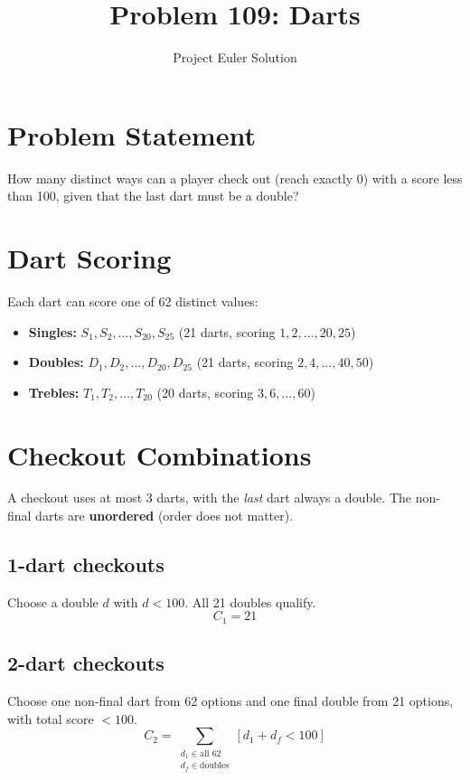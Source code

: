 \documentclass[12pt,a4paper]{article}
\title{Problem 109: Darts}
\author{Project Euler Solution}
\date{}
\begin{document}
\maketitle

\section{Problem Statement}

How many distinct ways can a player check out (reach exactly 0) with a score less than 100, given that the last dart must be a double?

\section{Dart Scoring}

Each dart can score one of 62 distinct values:
\begin{itemize}
    \item \textbf{Singles:} $S_1, S_2, \ldots, S_{20}, S_{25}$ (21 darts, scoring $1, 2, \ldots, 20, 25$)
    \item \textbf{Doubles:} $D_1, D_2, \ldots, D_{20}, D_{25}$ (21 darts, scoring $2, 4, \ldots, 40, 50$)
    \item \textbf{Trebles:} $T_1, T_2, \ldots, T_{20}$ (20 darts, scoring $3, 6, \ldots, 60$)
\end{itemize}

\section{Checkout Combinations}

A checkout uses at most 3 darts, with the \emph{last} dart always a double. The non-final darts are \textbf{unordered} (order does not matter).

\subsection{1-dart checkouts}

Choose a double $d$ with $d < 100$. All 21 doubles qualify.
\[
C_1 = 21
\]

\subsection{2-dart checkouts}

Choose one non-final dart from 62 options and one final double from 21 options, with total score $< 100$.
\[
C_2 = \sum_{\substack{d_1 \in \text{all 62} \\ d_f \in \text{doubles}}} [d_1 + d_f < 100]
\]
\end{document}
